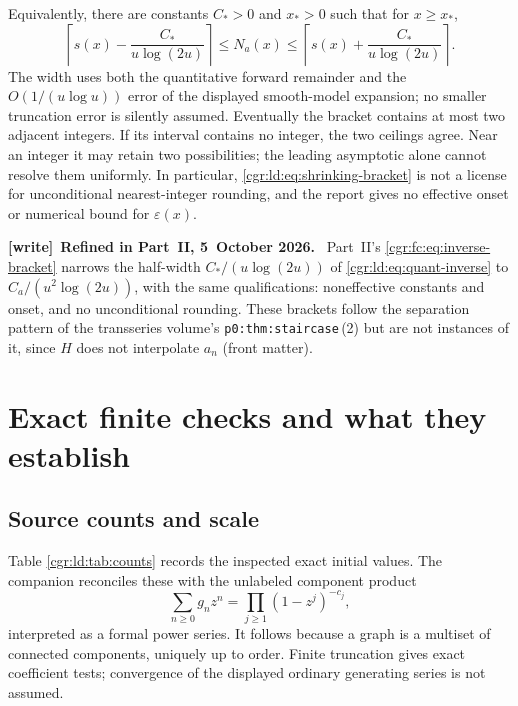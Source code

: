\documentclass[11pt,letterpaper]{article}
\numberwithin{equation}{section}
\theoremstyle{definition}\newtheorem{definition}[theorem]{Definition}
\theoremstyle{remark}\newtheorem{remark}[theorem]{Remark}
\newcommand{\eps}{\varepsilon}
\newcommand{\ceil}[1]{\left\lceil #1\right\rceil}
\newenvironment{writenote}[1][]{\par\smallskip\begingroup\small
 \noindent\textbf{[write]}\if\relax\detokenize{#1}\relax\else~\textbf{#1.}\fi\ }%
 {\par\endgroup\smallskip}
\begin{document}
Equivalently, there are constants $C_*>0$ and $x_*>0$ such that
for $x\ge x_*$,
\begin{equation}\label{cgr:ld:eq:quant-inverse}
 \ceil{s(x)-\frac{C_*}{u\log(2u)}}
 \le N_a(x)\le
 \ceil{s(x)+\frac{C_*}{u\log(2u)}}.
\end{equation}
The width uses both the quantitative forward remainder and the
$O(1/(u\log u))$ error of the displayed smooth-model expansion;
no smaller truncation error is silently assumed.
Eventually the bracket contains at most two adjacent integers.
If its interval contains no integer, the two ceilings agree.
Near an integer it may retain two possibilities; the leading
asymptotic alone cannot resolve them uniformly. In particular,
\eqref{cgr:ld:eq:shrinking-bracket} is not a license for unconditional
nearest-integer rounding, and the report gives no effective
onset or numerical bound for $\eps(x)$.
\begin{writenote}[Refined in Part~II, 5~October 2026]
Part~II's \eqref{cgr:fc:eq:inverse-bracket} narrows the half-width $C_*/(u\log(2u))$ of \eqref{cgr:ld:eq:quant-inverse} to $C_a/(u^2\log(2u))$, with the same qualifications: noneffective constants and onset, and no unconditional rounding. These brackets follow the separation pattern of the transseries volume's \texttt{p0:thm:staircase}\,(2) but are not instances of it, since $H$ does not interpolate $a_n$ (front matter).
\end{writenote}

\section{Exact finite checks and what they establish}\label{cgr:ld:sec:checks}
\subsection{Source counts and scale}
Table \ref{cgr:ld:tab:counts} records the inspected exact initial values.
The companion reconciles these with the unlabeled component
product
\begin{equation}\label{cgr:ld:eq:Euler-product}
 \sum_{n\ge0}g_nz^n=\prod_{j\ge1}(1-z^j)^{-c_j},
\end{equation}
interpreted as a formal power series. It follows because a graph
is a multiset of connected components, uniquely up to order.
Finite truncation gives exact coefficient tests; convergence of
the displayed ordinary generating series is not assumed.
\end{document}
